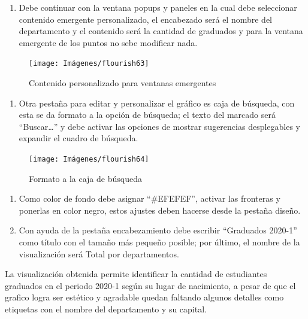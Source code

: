 \documentclass[
]{book}
\providecommand{\tightlist}{%
  \setlength{\itemsep}{0pt}\setlength{\parskip}{0pt}}
\begin{document}
\begin{enumerate}
\def\labelenumi{\arabic{enumi}.}
\setcounter{enumi}{3}
\tightlist
\item
  Debe continuar con la ventana popups y paneles en la cual debe seleccionar contenido emergente personalizado, el encabezado será el nombre del departamento y el contenido será la cantidad de graduados y para la ventana emergente de los puntos no sebe modificar nada.
\end{enumerate}

\begin{figure}

{\centering \texttt{[image: Imágenes/flourish63]} 

}

\caption{Contenido personalizado para ventanas emergentes}\label{fig:paso4mapadeptosflourish-fig}
\end{figure}

\begin{enumerate}
\def\labelenumi{\arabic{enumi}.}
\setcounter{enumi}{4}
\tightlist
\item
  Otra pestaña para editar y personalizar el gráfico es caja de búsqueda, con esta se da formato a la opción de búsqueda; el texto del marcado será ``Buscar\ldots{}'' y debe activar las opciones de mostrar sugerencias desplegables y expandir el cuadro de búsqueda.
\end{enumerate}

\begin{figure}

{\centering \texttt{[image: Imágenes/flourish64]} 

}

\caption{Formato a la caja de búsqueda}\label{fig:paso5mapadeptosflourish-fig}
\end{figure}

\begin{enumerate}
\def\labelenumi{\arabic{enumi}.}
\setcounter{enumi}{5}
\item
  Como color de fondo debe asignar ``\#EFEFEF'', activar las fronteras y ponerlas en color negro, estos ajustes deben hacerse desde la pestaña diseño.
\item
  Con ayuda de la pestaña encabezamiento debe escribir ``Graduados 2020-1'' como título con el tamaño más pequeño posible; por último, el nombre de la visualización será Total por departamentos.
\end{enumerate}

La visualización obtenida permite identificar la cantidad de estudiantes graduados en el periodo 2020-1 según su lugar de nacimiento, a pesar de que el grafico logra ser estético y agradable quedan faltando algunos detalles como etiquetas con el nombre del departamento y su capital.
\end{document}
